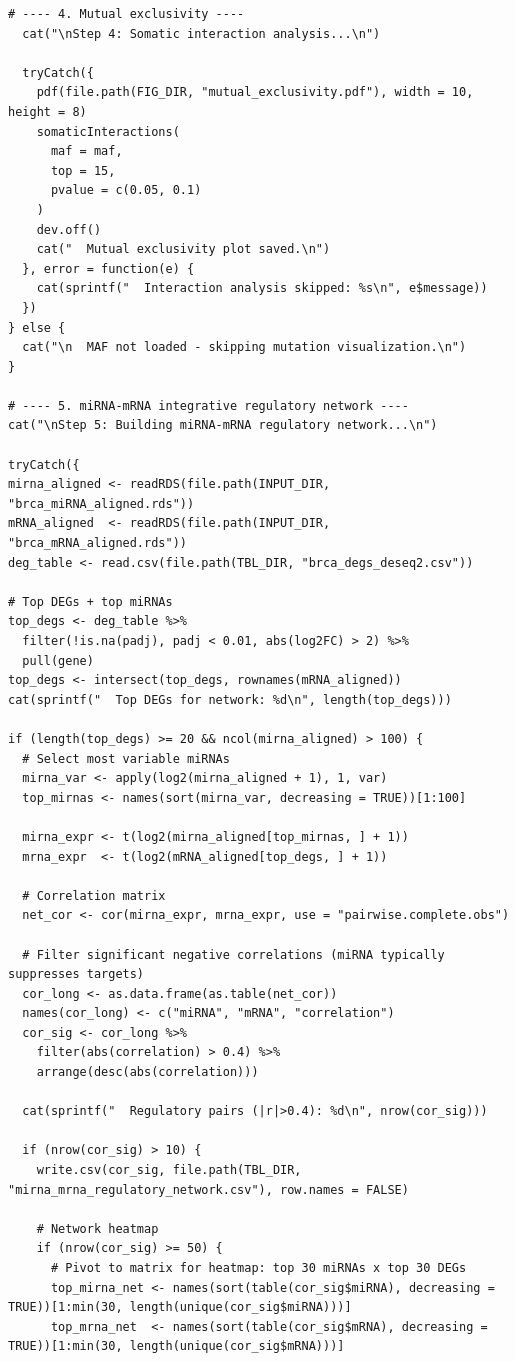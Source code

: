 \documentclass[12pt,a4paper]{ctexart}
\begin{document}
\begin{lstlisting}[caption={12_advanced_algorithms}, basicstyle=\ttfamily\scriptsize]
  # ---- 4. Mutual exclusivity ----
  cat("\nStep 4: Somatic interaction analysis...\n")

  tryCatch({
    pdf(file.path(FIG_DIR, "mutual_exclusivity.pdf"), width = 10, height = 8)
    somaticInteractions(
      maf = maf,
      top = 15,
      pvalue = c(0.05, 0.1)
    )
    dev.off()
    cat("  Mutual exclusivity plot saved.\n")
  }, error = function(e) {
    cat(sprintf("  Interaction analysis skipped: %s\n", e$message))
  })
} else {
  cat("\n  MAF not loaded - skipping mutation visualization.\n")
}

# ---- 5. miRNA-mRNA integrative regulatory network ----
cat("\nStep 5: Building miRNA-mRNA regulatory network...\n")

tryCatch({
mirna_aligned <- readRDS(file.path(INPUT_DIR, "brca_miRNA_aligned.rds"))
mRNA_aligned  <- readRDS(file.path(INPUT_DIR, "brca_mRNA_aligned.rds"))
deg_table <- read.csv(file.path(TBL_DIR, "brca_degs_deseq2.csv"))

# Top DEGs + top miRNAs
top_degs <- deg_table %>%
  filter(!is.na(padj), padj < 0.01, abs(log2FC) > 2) %>%
  pull(gene)
top_degs <- intersect(top_degs, rownames(mRNA_aligned))
cat(sprintf("  Top DEGs for network: %d\n", length(top_degs)))

if (length(top_degs) >= 20 && ncol(mirna_aligned) > 100) {
  # Select most variable miRNAs
  mirna_var <- apply(log2(mirna_aligned + 1), 1, var)
  top_mirnas <- names(sort(mirna_var, decreasing = TRUE))[1:100]

  mirna_expr <- t(log2(mirna_aligned[top_mirnas, ] + 1))
  mrna_expr  <- t(log2(mRNA_aligned[top_degs, ] + 1))

  # Correlation matrix
  net_cor <- cor(mirna_expr, mrna_expr, use = "pairwise.complete.obs")

  # Filter significant negative correlations (miRNA typically suppresses targets)
  cor_long <- as.data.frame(as.table(net_cor))
  names(cor_long) <- c("miRNA", "mRNA", "correlation")
  cor_sig <- cor_long %>%
    filter(abs(correlation) > 0.4) %>%
    arrange(desc(abs(correlation)))

  cat(sprintf("  Regulatory pairs (|r|>0.4): %d\n", nrow(cor_sig)))

  if (nrow(cor_sig) > 10) {
    write.csv(cor_sig, file.path(TBL_DIR, "mirna_mrna_regulatory_network.csv"), row.names = FALSE)

    # Network heatmap
    if (nrow(cor_sig) >= 50) {
      # Pivot to matrix for heatmap: top 30 miRNAs x top 30 DEGs
      top_mirna_net <- names(sort(table(cor_sig$miRNA), decreasing = TRUE))[1:min(30, length(unique(cor_sig$miRNA)))]
      top_mrna_net  <- names(sort(table(cor_sig$mRNA), decreasing = TRUE))[1:min(30, length(unique(cor_sig$mRNA)))]


\end{lstlisting}
\end{document}
